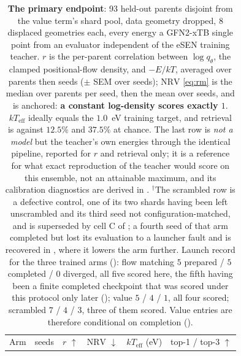 \begin{table}[h]
\caption{\textbf{The primary endpoint}: 93 held-out parents disjoint from the value term's shard
pool, data geometry dropped, $8$ displaced geometries each, every energy a GFN2-xTB single point
from an evaluator independent of the eSEN training teacher. $r$ is the per-parent correlation between $\log q_\theta$, the clamped positional-flow density,
and $-E/kT$, averaged over parents then seeds ($\pm$ SEM over seeds);
$\mathrm{NRV}$ \eqref{eq:rm} is the median over parents per seed, then the mean over seeds, and is
anchored: \textbf{a constant log-density scores exactly $1$}. $kT_{\mathrm{eff}}$ ideally equals
the $1.0$~eV training target, and retrieval is against $12.5\%$ and $37.5\%$ at chance. The last row is
\emph{not a model} but the teacher's own energies through the identical pipeline, reported for $r$
and retrieval only; it is a reference for what exact reproduction of the teacher would score on
this ensemble, not an attainable maximum, and its calibration diagnostics are derived in
. $^{\dagger}$The scrambled row is a defective control, one of its two shards
having been left unscrambled and its third seed not configuration-matched, and is superseded by cell C of
; a fourth seed of that arm completed but lost its evaluation to a launcher fault
and is recovered in , where it lowers the arm further. Launch record for the three
trained arms (): flow matching $5$ prepared / $5$ completed / $0$ diverged, all five
scored here, the fifth having been a finite completed checkpoint that was scored under this
protocol only later (); value $5$ / $4$ / $1$, all four scored; scrambled
$7$ / $4$ / $3$, three of them scored. Value entries are therefore conditional on completion
().}
\label{tab:primary}
\begin{center}
\small
\setlength{\tabcolsep}{5pt}
\begin{tabular}{lccccc}
\toprule
Arm & seeds & $r$ $\uparrow$ & $\mathrm{NRV}$ $\downarrow$ & $kT_{\mathrm{eff}}$ (eV) & top-1 / top-3 $\uparrow$ \\

\end{tabular}
\end{center}
\end{table}
